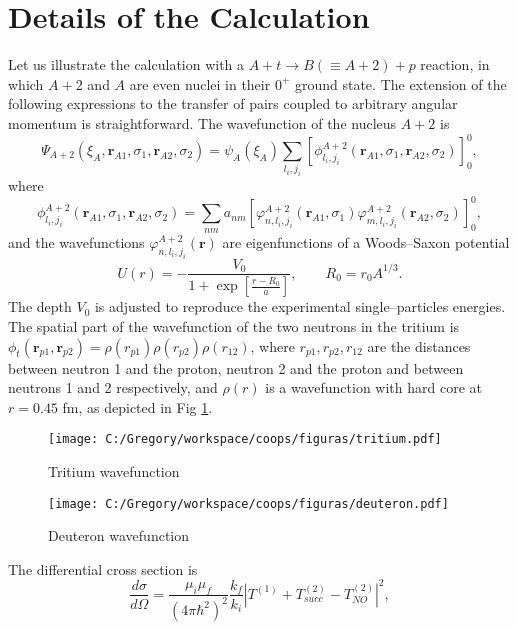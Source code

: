 \documentclass[a4paper,14pt]{book}
\begin{document}
\section{Details of the Calculation}
Let us illustrate the calculation with a $A+t \rightarrow B(\equiv A+2)+p$ reaction, in which $A+2$ and $A$ are even nuclei in their $0^+$ ground state. The extension of the following expressions to the transfer of pairs coupled to arbitrary angular momentum is straightforward. The wavefunction of the nucleus $A+2$ is 
\begin{equation}\label{eq1}
\Psi_{A+2}(\xi_A,\mathbf r_{A1},\sigma_1,\mathbf r_{A2},\sigma_2)=\psi_A(\xi_A)\sum_{l_i,j_i}[\phi^{A+2}_{l_i,j_i}(\mathbf r_{A1},\sigma_1,\mathbf r_{A2},\sigma_2)]^0_0,
\end{equation} 
where 
\begin{equation}\label{eq2}
\phi^{A+2}_{l_i,j_i}(\mathbf r_{A1},\sigma_1,\mathbf r_{A2},\sigma_2)=\sum_{nm}a_{nm}\left[\varphi^{A+2}_{n,l_i,j_i}(\mathbf r_{A1},\sigma_1)\varphi^{A+2}_{m,l_i,j_i}(\mathbf r_{A2},\sigma_2)\right]^0_0,
\end{equation} 
and the wavefunctions $\varphi^{A+2}_{n,l_i,j_i}(\mathbf r)$ are eigenfunctions of a Woods--Saxon potential
\begin{equation}\label{Eq17}
U(r)=-\frac{V_0}
{1+\exp\left[\frac{r-R_0}{a}\right]},\quad\quad R_0=r_0 A^{1/3}.
\end{equation}
The depth $V_0$ is adjusted to reproduce the experimental single--particles energies.
 The spatial part of the  wavefunction of the two neutrons in the tritium is $\phi_t(\mathbf r_{p1},\mathbf r_{p2})=\rho(r_{p1})\rho(r_{p2})\rho(r_{12})$, where $r_{p1},r_{p2},r_{12}$ are the distances between neutron 1 and the proton, neutron 2 and the proton and between neutrons 1 and 2 respectively, and $\rho(r)$ is a wavefunction with hard core at $r=0.45$ fm, as depicted in Fig \ref{fig1}.
 
\begin{figure}
\centerline{\texttt{[image: C:/Gregory/workspace/coops/figuras/tritium.pdf]}}
\caption{Tritium wavefunction}\label{fig1}
\end{figure}
\begin{figure}
\centerline{\texttt{[image: C:/Gregory/workspace/coops/figuras/deuteron.pdf]}}
\caption{Deuteron wavefunction}\label{fig2}
\end{figure}
The differential cross section is
\begin{equation}
\frac{d\sigma}{d\Omega}=\frac{\mu_i\mu_f}{(4\pi\hbar^2)^2}\frac{k_f}{k_i}\left|T^{(1)}+T^{(2)}_{succ}-T^{(2)}_{NO}\right|^2,
\end{equation}
\end{document}
